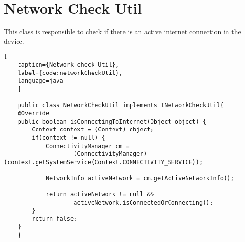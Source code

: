 \newpage
\section{Network Check Util}
This class is responsible to check if there is an active internet 
connection in the device.
\begin{lstlisting}[
    caption={Network check Util},
    label={code:networkCheckUtil},
    language=java
    ]

    public class NetworkCheckUtil implements INetworkCheckUtil{
    @Override
    public boolean isConnectingToInternet(Object object) {
        Context context = (Context) object;
        if(context != null) {
            ConnectivityManager cm =
                    (ConnectivityManager) (context.getSystemService(Context.CONNECTIVITY_SERVICE));

            NetworkInfo activeNetwork = cm.getActiveNetworkInfo();

            return activeNetwork != null &&
                    activeNetwork.isConnectedOrConnecting();
        }
        return false;
    }
    }
\end{lstlisting}    

